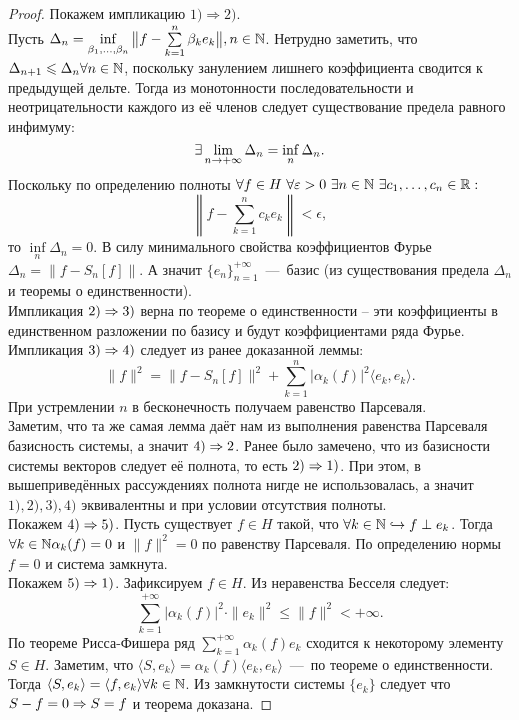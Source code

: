 \begin{proof}
    Покажем импликацию $1) \Rightarrow 2)$. \\
    Пусть $\Delta_n = \inf\limits_{\beta_1, \ldots, \beta_n} \big\|f - \sum\limits_{k = 1}^n \beta_k e_k \big\|, n \in \mathbb{N}$.
    Нетрудно заметить, что $\Delta_{n + 1} \leqslant \Delta_n \forall n \in \mathbb{N}$, поскольку занулением лишнего коэффициента сводится к предыдущей дельте.
    Тогда из монотонности последовательности и неотрицательности каждого из её членов следует существование предела равного инфимуму:
    \[
        \exists \lim\limits_{n \rightarrow +\infty} \Delta_n = \inf\limits_n \Delta_n.
    \]
    Поскольку по определению полноты $\forall f \in H \  \forall \varepsilon > 0 \ \exists n \in \mathbb{N} \ \exists c_1, \ldots, c_n \in \mathbb{R}:$
    \[
        \left\|f - \sum\limits_{k = 1}^n c_k e_k\right\| < \epsilon,
    \]
    то $\inf\limits_n \Delta_n = 0$.
    В силу минимального свойства коэффициентов Фурье $\Delta_n = \|f - S_n[f]\|$.
    А значит $\{e_n\}_{n = 1}^{+\infty}$~---~базис (из существования предела $\Delta_n$ и теоремы о единственности). \\
    Импликация $2) \Rightarrow 3)$ верна по теореме о единственности -- эти коэффициенты в единственном разложении по базису и будут коэффициентами ряда Фурье. \\
    Импликация $3) \Rightarrow 4)$ следует из ранее доказанной леммы:
    \[
        \|f\|^2 = \|f - S_n[f]\|^2 + \sum\limits_{k = 1}^n |\alpha_k(f)|^2 \langle e_k, e_k \rangle.
    \]
    При устремлении $n$ в бесконечность получаем равенство Парсеваля. \\
    Заметим, что та же самая лемма даёт нам из выполнения равенства Парсеваля базисность системы, а значит $4) \Rightarrow 2$.
    Ранее было замечено, что из базисности системы векторов следует её полнота, то есть $2) \Rightarrow 1)$.
    При этом, в вышеприведённых рассуждениях полнота нигде не использовалась, а значит $1), 2), 3), 4)$ эквивалентны и при условии отсутствия полноты. \\
    Покажем $4) \Rightarrow 5)$.
    Пусть существует $f \in H$ такой, что $\forall k \in \mathbb{N} \hookrightarrow f \perp e_k$.
    Тогда $\forall k \in \mathbb{N} \alpha_k(f) = 0$ и $\|f\|^2 = 0$ по равенству Парсеваля.
    По определению нормы $f = 0$ и система замкнута. \\
    Покажем $5) \Rightarrow 1)$.
    Зафиксируем $f \in H$.
    Из неравенства Бесселя следует:
    \[
        \sum\limits_{k = 1}^{+\infty} |\alpha_k(f)|^2\cdot\|e_k\|^2 \leq \|f\|^2 < +\infty.
    \]
    По теореме Рисса-Фишера ряд $\sum\limits_{k = 1}^{+\infty} \alpha_k(f) e_k$ сходится к некоторому элементу $S \in H$.
    Заметим, что $\langle S, e_k \rangle = \alpha_k(f) \langle e_k, e_k \rangle$~---~по теореме о единственности.
    Тогда $\langle S, e_k \rangle = \langle f, e_k \rangle \forall k \in \mathbb{N}$.
    Из замкнутости системы $\{e_k\}$ следует что $S - f = 0 \Rightarrow S = f$ и теорема доказана.
\end{proof}
